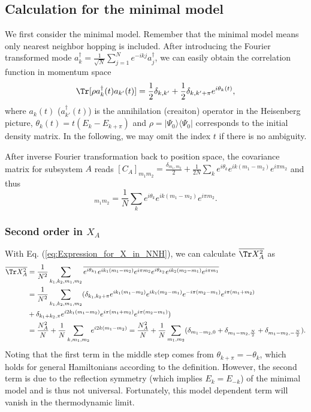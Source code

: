 \subsection{Calculation for the minimal model}
We first consider the minimal model. %
Remember that the minimal model means only nearest neighbor hopping
is included. 
 After introducing the Fourier transformed 
 mode $a_{k}^{\dagger}=\frac{1}{\sqrt{N}}\sum_{j=1}^{N}e^{-ikj}a_{j}^{\dagger}$,
we can easily obtain the correlation function in momentum space 
\begin{equation}
\Tr[\rho a_{k}^{\dagger}(t)a_{k'}(t)]=\frac{1}{2}\delta_{k,k'}+\frac{1}{2}\delta_{k,k'+\pi}e^{i\theta_{k}(t)},
\end{equation}
where $a_k(t)$ ($a^\dag_{k'}(t)$) is the annihilation (creaiton) operator in the Heisenberg picture, $\theta_{k}(t)=t(E_{k}-E_{k+\pi})$ and $\rho=|\Psi_0\rangle\langle\Psi_0|$ corresponds
to the initial density matrix. In the following, we may omit %
the
index $t$ if there is no ambiguity.

After inverse Fourier transformation back to position space, the covariance
matrix for subsystem $A$ reads  $[C_A]_{m_{1}m_{2}}=\frac{\delta_{m_{1},m_{2}}}{2}+\frac{1}{2N}\sum_{k}e^{i\theta_{k}}e^{ik(m_{1}-m_{2})}e^{i\pi m_{2}}$
and thus
\begin{equation}
[X_A]_{m_{1}m_{2}}=\frac{1}{N}\sum_{k}e^{i\theta_{k}}e^{ik(m_{1}-m_{2})}e^{i\pi m_{2}}.
\label{eq:Expression_for_X_in_NNH}
\end{equation}


\subsubsection{Second order in $X_{A}$}

With Eq. (\ref{eq:Expression_for_X_in_NNH}), we can calculate $\overline{\Tr X_{A}^{2}}$ as
\begin{align*}
\overline{\Tr X_{A}^{2}} & =\frac{1}{N^{2}}\sum_{k_{1},k_{2},m_{1},m_{2}}\overline{e^{i\theta_{k_{1}}}e^{ik_{1}(m_{1}-m_{2})}e^{i\pi m_{2}}e^{i\theta_{k_{2}}}e^{ik_{2}(m_{2}-m_{1})}e^{i\pi m_{1}}}\\
 & =\frac{1}{N^{2}}\sum_{k_{1},k_{2},m_{1},m_{2}}(\delta_{k_{1},k_{2}+\pi}e^{ik_{1}(m_{1}-m_{2})}e^{ik_{1}(m_{2}-m_{1})}e^{-i\pi(m_{2}-m_{1})}e^{i\pi(m_{1}+m_{2})}\\
 & +\delta_{k_{1}+k_{2},\pi}e^{i2k_{1}(m_{1}-m_{2})}e^{i\pi(m_{1}+m_{2})}e^{i\pi(m_{2}-m_{1})})\\
 & =\frac{N_{A}^{2}}{N}+\frac{1}{N}\sum_{k,m_{1},m_{2}}e^{i2k(m_{1}-m_{2})}=\frac{N_{A}^{2}}{N}+\frac{1}{N}\sum_{m_{1},m_{2}}(\delta_{m_{1}-m_{2},0}+\delta_{m_{1}-m_{2},\frac{N}{2}}+\delta_{m_{1}-m_{2},-\frac{N}{2}}).
\end{align*}
Noting that the first term in the middle step comes from $\theta_{k+\pi}=-\theta_{k}$,
which holds for general Hamiltonians according to the definition. However,
the second term is due to the reflection symmetry (which implies $E_k=E_{-k}$) of %
the minimal model and is thus not universal. 
Fortunately, this model dependent term will vanish in the thermodynamic limit.

